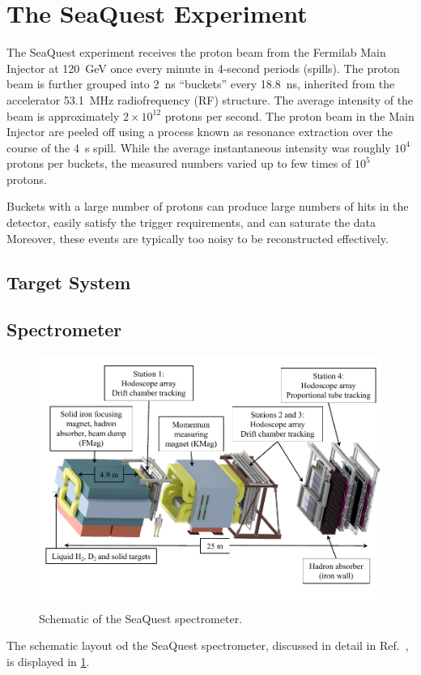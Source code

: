 \documentclass[reprint,aps,unsortedaddress,superscriptaddress,prl,floatfix,showpacs,linenumbers]{revtex4-2}
\begin{document}
\section{The SeaQuest Experiment}
The SeaQuest experiment receives the  proton beam from the Fermilab Main Injector at \SI{120}{\GeV}
once every minute in 4-second periods (spills).
The proton beam is further grouped into \SI{2}{\ns} ``buckets'' every \SI{18.8}{\ns},
inherited from the accelerator \SI{53.1}{\MHz} radiofrequency (RF) structure.
The average intensity of the beam is approximately $2\times 10^{12}$ protons per second.
The proton beam in the Main Injector are peeled off using a process known as resonance
extraction over the course of the \SI{4}{\second} spill.
While the average instantaneous intensity was roughly $10^4$ protons per buckets,
the measured numbers varied up to few times of $10^5$ protons.

Buckets with a large number of protons can produce large numbers of hits in the detector,
easily satisfy the trigger requirements, and can saturate the data  
Moreover, these events are typically too noisy to be reconstructed effectively.
\subsection{Target System}
\subsection{Spectrometer}
\begin{figure}
	\centering
	\includegraphics[width=0.8\linewidth]{spectrometer/twoColumnSeaQuestSpectrometerNIM.pdf}
	\caption{Schematic of the SeaQuest spectrometer.}
	\label{fig:spectrometer}
\end{figure}
The schematic layout od the SeaQuest spectrometer, discussed in detail in Ref.~\cite{aidala2019},
is displayed in \cref{fig:spectrometer}.
\end{document}
